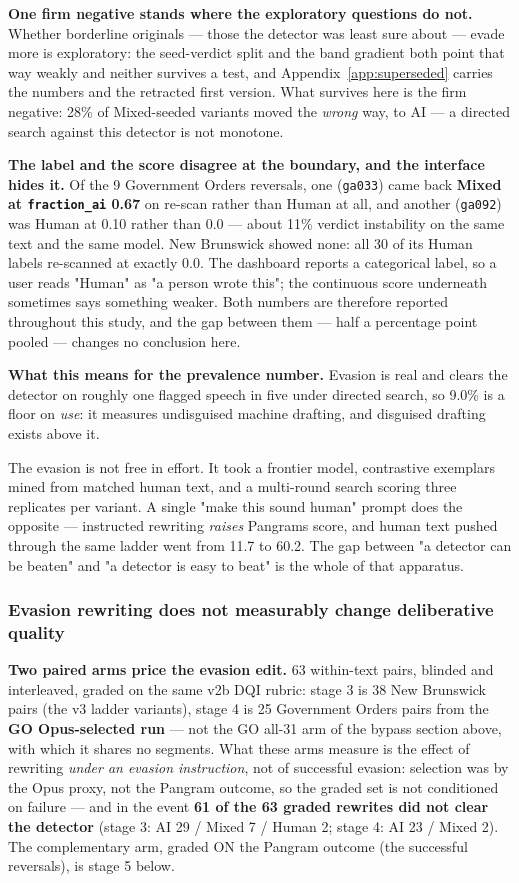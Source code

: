 \textbf{One firm negative stands where the exploratory questions do not.} Whether
borderline originals --- those the detector was least sure about --- evade more is
exploratory: the seed-verdict split and the band gradient both point that way
weakly and neither survives a test, and Appendix~\ref{app:superseded} carries the numbers and the
retracted first version. What survives here is the firm negative: 28\% of
Mixed-seeded variants moved the \emph{wrong} way, to AI --- a directed search against
this detector is not monotone.

\textbf{The label and the score disagree at the boundary, and the interface hides
it.} Of the 9 Government Orders reversals, one (\texttt{ga033}) came back \textbf{Mixed at
\texttt{fraction\_ai} 0.67} on re-scan rather than Human at all, and another
(\texttt{ga092}) was Human at 0.10 rather than 0.0 --- about 11\% verdict instability on
the same text and the same model. New Brunswick showed none: all 30 of its
Human labels re-scanned at exactly 0.0. The dashboard reports a categorical
label, so a user reads "Human" as "a person wrote this"; the continuous score
underneath sometimes says something weaker. Both numbers are therefore reported
throughout this study, and the gap between them --- half a percentage point
pooled --- changes no conclusion here.

\textbf{What this means for the prevalence number.} Evasion is real and clears the
detector on roughly one flagged speech in five under directed search, so 9.0\%
is a floor on \emph{use}: it measures undisguised machine drafting, and disguised
drafting exists above it.

The evasion is not free in effort. It took a frontier model, contrastive
exemplars mined from matched human text, and a multi-round search scoring
three replicates per variant. A single "make this sound human" prompt does the
opposite --- instructed rewriting \emph{raises} Pangram\textquotesingle s score, and human text
pushed through the same ladder went from 11.7 to 60.2. The gap between "a
detector can be beaten" and "a detector is easy to beat" is the whole of that
apparatus.

\subsubsection{Evasion rewriting does not measurably change deliberative quality}\label{sec:evasion-quality}

\textbf{Two paired arms price the evasion edit.} 63 within-text pairs, blinded and
interleaved, graded on the same v2b DQI rubric: stage 3 is 38 New Brunswick
pairs (the v3 ladder variants), stage 4 is 25 Government Orders pairs from the
\textbf{GO Opus-selected run} --- not the GO all-31 arm of the bypass section above,
with which it shares no segments. What these arms measure is the effect of
rewriting \emph{under an evasion instruction}, not of successful evasion: selection
was by the Opus proxy, not the Pangram outcome, so the graded set is not
conditioned on failure --- and in the event \textbf{61 of the 63 graded rewrites did
not clear the detector} (stage 3: AI 29 / Mixed 7 / Human 2; stage 4: AI 23 /
Mixed 2). The complementary arm, graded ON the Pangram outcome (the successful
reversals), is stage 5 below.

